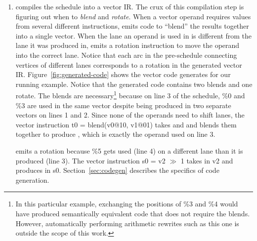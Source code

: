 \begin{enumerate}
    \item \system compiles the schedule into a vector IR. The crux of this compilation step is figuring out when to {\em blend} and {\em rotate}. When a vector operand requires values from several different instructions, \system emits code to ``blend'' the results together into a single vector.
    When the lane an operand is used in is different from the lane it was produced in, \system emits a rotation instruction to move the operand into the correct lane. Notice that each arc in the pre-schedule connecting vertices of different lanes corresponds to a rotation in the generated vector IR.
    Figure~\ref{fig:generated-code} shows the vector code \system generates for our running example.
    Notice that the generated code contains two blends and one rotate.
    The blends are necessary\footnote{In this particular example, exchanging the positions of {\sf \%3} and {\sf \%4} would have produced semantically equivalent code that does not require the blends. However, automatically performing arithmetic rewrites such as this one is outside the scope of this work.} because on line 3 of the schedule, {\sf \%0} and {\sf \%3} are used in the same vector despite being produced in two separate vectors on lines 1 and 2. 
    Since none of the operands need to shift lanes, the vector instruction {\sf t0 = blend(v0@10, v1@01)} takes {\sf [\%0, \%4]} and {\sf [\%1, \%3]} and blends them together to produce {\sf [\%0, \%3]}, which is exactly the operand used on line 3. 

    \system emits a rotation because {\sf \%5} gets used (line 4) on a different lane than it is produced (line 3).
    The vector instruction {\sf s0 = v2 $\gg$ 1} takes {\sf [\%2, \%5]} in {\sf v2} and produces {\sf [\%5, \%2]} in {\sf s0}.
    Section~\ref{sec:codegen} describes the specifics of code generation.
\end{enumerate}

